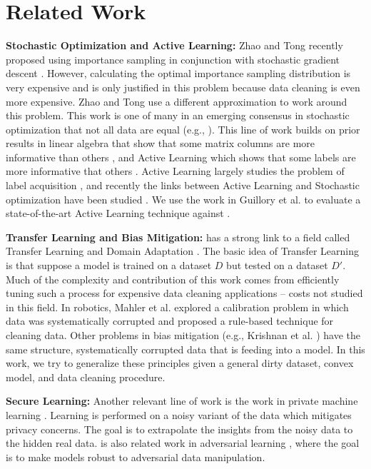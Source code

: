 \vspace{-2em}
\section{Related Work}
\noindent \textbf{Stochastic Optimization and Active Learning: } Zhao and Tong recently proposed using importance sampling in conjunction with stochastic gradient descent \cite{zhao2014stochastic}. 
However, calculating the optimal importance sampling distribution is very expensive and is only justified in this problem because data cleaning is even more expensive. 
Zhao and Tong use a different approximation to work around this problem. 
This work is one of many in an emerging consensus in stochastic optimization that not all data are equal (e.g., \cite{qu2014randomized}). 
This line of work builds on prior results in linear algebra that show that some matrix columns are more informative than others \cite{drineas2012fast}, and Active Learning which shows that some labels are more informative that others \cite{settles2010active}.
Active Learning largely studies the problem of label acquisition \cite{settles2010active},
and recently the links between Active Learning and Stochastic optimization have been studied \cite{guillory2009active}. 
We use the work in Guillory et al. to evaluate a state-of-the-art Active Learning technique against \sys.

\noindent \textbf{Transfer Learning and Bias Mitigation: }  
\sys has a strong link to a field called Transfer Learning and Domain Adaptation \cite{pan2010survey}. The basic idea of Transfer Learning is that suppose a model is trained on a dataset $D$ but tested on a dataset $D'$. Much of the complexity and contribution of this work comes from efficiently tuning such a process for expensive data cleaning applications -- costs not studied in this field.
In robotics, Mahler et al. explored a calibration problem in which data was systematically corrupted \cite{DBLP:conf/case/MahlerKLSMKPWFAG14} and proposed a rule-based technique for cleaning data.
Other problems in bias mitigation (e.g., Krishnan et al. \cite{DBLP:conf/recsys/KrishnanPFG14}) have the same structure, systematically corrupted data that is feeding into a model.
In this work, we try to generalize these principles given a general dirty dataset, convex model, and data cleaning procedure.

\noindent \textbf{Secure Learning: } Another relevant line of work is the work in private machine learning  \cite{wainwright2012privacy, duchi2013local}. Learning is performed on a noisy variant of the data which mitigates privacy concerns. The goal is to extrapolate the insights from the noisy data to the hidden real data. \sys is also related work in adversarial learning \cite{nelson2012query}, where the goal is to make models robust to adversarial data manipulation.

